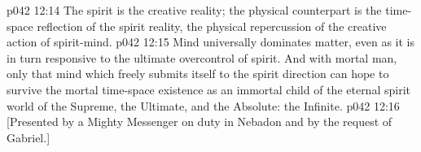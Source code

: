 \vs p042 12:14 The spirit is the creative reality; the physical counterpart is the time\hyp{}space reflection of the spirit reality, the physical repercussion of the creative action of spirit\hyp{}mind.
\vs p042 12:15 Mind universally dominates matter, even as it is in turn responsive to the ultimate overcontrol of spirit. And with mortal man, only that mind which freely submits itself to the spirit direction can hope to survive the mortal time\hyp{}space existence as an immortal child of the eternal spirit world of the Supreme, the Ultimate, and the Absolute: the Infinite.
\vsetoff
\vs p042 12:16 [Presented by a Mighty Messenger on duty in Nebadon and by the request of Gabriel.]
\quizlink
